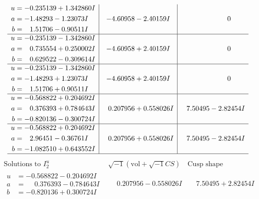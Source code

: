 \documentclass[1p]{elsarticle_modified}
\theoremstyle{definition}
\newcommand{\I}{\sqrt{-1}}
\begin{document}
$$\begin{array}{c|c|c}
\begin{aligned}
u &= -0.235139 + 1.342860 I \\
a &= -1.48293 - 1.23073 I \\
b &= \phantom{-}1.51706 - 0.90511 I\end{aligned}
 & -4.60958 - 2.40159 I & \phantom{-0.000000 } 0 \\ \hline\begin{aligned}
u &= -0.235139 - 1.342860 I \\
a &= \phantom{-}0.735554 + 0.250002 I \\
b &= \phantom{-}0.629522 - 0.309614 I\end{aligned}
 & -4.60958 + 2.40159 I & \phantom{-0.000000 } 0 \\ \hline\begin{aligned}
u &= -0.235139 - 1.342860 I \\
a &= -1.48293 + 1.23073 I \\
b &= \phantom{-}1.51706 + 0.90511 I\end{aligned}
 & -4.60958 + 2.40159 I & \phantom{-0.000000 } 0 \\ \hline\begin{aligned}
u &= -0.568822 + 0.204692 I \\
a &= \phantom{-}0.376393 + 0.784643 I \\
b &= -0.820136 - 0.300724 I\end{aligned}
 & \phantom{-}0.207956 + 0.558026 I & \phantom{-}7.50495 - 2.82454 I \\ \hline\begin{aligned}
u &= -0.568822 + 0.204692 I \\
a &= \phantom{-}2.96451 - 0.36761 I \\
b &= -1.082510 + 0.643552 I\end{aligned}
 & \phantom{-}0.207956 + 0.558026 I & \phantom{-}7.50495 - 2.82454 I\\
 \hline 
 \end{array}$$\newpage$$\begin{array}{c|c|c}  
\text{Solutions to }I^u_{2}& \I (\text{vol} + \sqrt{-1}CS) & \text{Cusp shape}\\
 \hline 
\begin{aligned}
u &= -0.568822 - 0.204692 I \\
a &= \phantom{-}0.376393 - 0.784643 I \\
b &= -0.820136 + 0.300724 I\end{aligned}
 & \phantom{-}0.207956 - 0.558026 I & \phantom{-}7.50495 + 2.82454 I \\ \hline\begin{aligned}

\end{aligned}
\end{array}$$
\end{document}
